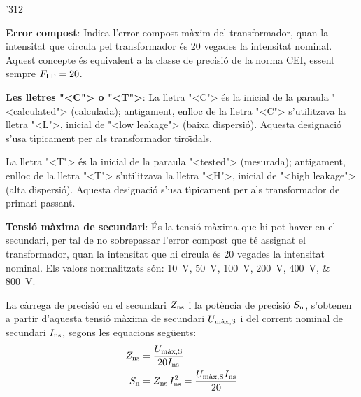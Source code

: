 \begin{dingautolist}{'312}
    \item \textbf{Error compost}: Indica l'error compost m\`{a}xim del
    transformador, quan la intensitat que circula pel
    transformador \'{e}s 20 vegades la intensitat nominal. Aquest concepte
     \'{e}s equivalent a la classe de precisi\'{o} de la norma \textsf{CEI},
     essent sempre $F_\mathrm{LP}=20$.
    \item \textbf{Les lletres {"<}C{">} o {"<}T{">}}: La lletra {"<}C{">} \'{e}s la inicial de la
    paraula  {"<}calculated{">} (calculada); antigament, enlloc de la lletra {"<}C{">}
    s'utilitzava la lletra {"<}L{">}, inicial de {"<}low leakage{">} (baixa
    dispersi\'{o}). Aquesta designaci\'{o} s'usa t\'{\i}picament per als
    transformador tiro\"{\i}dals.

    La lletra {"<}T{">} \'{e}s la inicial de la
    paraula  {"<}tested{">} (mesurada); antigament, enlloc de la lletra {"<}T{">}
    s'utilitzava la lletra {"<}H{">}, inicial de {"<}high leakage{">} (alta
    dispersi\'{o}). Aquesta designaci\'{o} s'usa t\'{\i}picament per als
    transformador de primari passant.
    \item \textbf{Tensi\'{o} m\`{a}xima de secundari}: \'{E}s la tensi\'{o} m\`{a}xima
    que hi pot haver en el secundari, per tal de no sobrepassar l'error compost que t\'{e}
    assignat el transformador, quan la intensitat que hi circula
     \'{e}s 20 vegades la intensitat nominal. Els valors
    normalitzats s\'{o}n: \SIlist{10; 50; 100; 200; 400; 800}{V}.

    La c\`{a}rrega de precisi\'{o} en el secundari
    $Z_\mathrm{ns}$ i la pot\`{e}ncia de precisi\'{o} $S_\mathrm{n}$, s'obtenen a partir d'aquesta
    tensi\'{o} m\`{a}xima de secundari $U_\mathrm{m\grave{a}x,S}$
    i del corrent     nominal de secundari $I_\mathrm{ns}$, segons les equacions seg\"{u}ents:
    \begin{align}
        Z_\mathrm{ns} &= \frac{U_\mathrm{m\grave{a}x,S}}{20 I_\mathrm{ns}}\\
        S_\mathrm{n} &= Z_\mathrm{ns} \,I_\mathrm{ns}^2 = \frac{U_\mathrm{m\grave{a}x,S} I_\mathrm{ns}}{20}
        \label{eq:sn_ti_ieee}
    \end{align}
\end{dingautolist}

